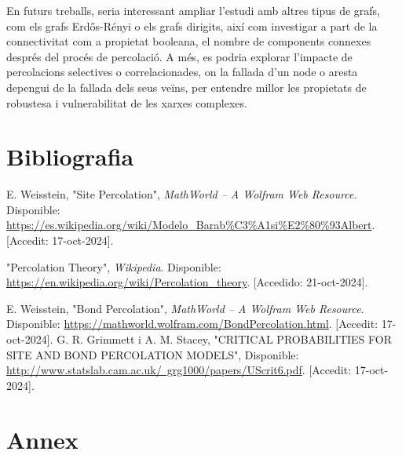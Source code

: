\documentclass[a4paper]{article}
\begin{document}
	En futurs treballs, seria interessant ampliar l'estudi amb altres tipus de grafs, com els grafs Erdős-Rényi o els grafs dirigits, així com investigar a part de la connectivitat com a propietat booleana, el nombre de components connexes després del procés de percolació. A més, es podria explorar l'impacte de percolacions selectives o correlacionades, on la fallada d'un node o aresta depengui de la fallada dels seus veïns, per entendre millor les propietats de robustesa i vulnerabilitat de les xarxes complexes.
	
	\newpage
	\section{Bibliografia}
	
	\renewcommand{\refname}{}	
	\begin{thebibliography}{99}
		\vspace{-2em}
		
		 E. Weisstein, "Site Percolation", \textit{MathWorld -- A Wolfram Web Resource}. Disponible: \href{https://es.wikipedia.org/wiki/Modelo_Barab%C3%A1si%E2%80%93Albert}{https://es.wikipedia.org/wiki/Modelo\_Barab\%C3\%A1si\%E2\%80\%93Albert}. [Accedit: 17-oct-2024].
		
		 "Percolation Theory", \textit{Wikipedia}. Disponible: \href{https://en.wikipedia.org/wiki/Percolation_theory}{https://en.wikipedia.org/wiki/Percolation\_theory}. [Accedido: 21-oct-2024].
		
		
		 E. Weisstein, "Bond Percolation", \textit{MathWorld -- A Wolfram Web Resource}. Disponible: \href{https://mathworld.wolfram.com/BondPercolation.html}{https://mathworld.wolfram.com/BondPercolation.html}. [Accedit: 17-oct-2024].
		 G. R. Grimmett i A. M. Stacey, "CRITICAL PROBABILITIES FOR SITE
		AND BOND PERCOLATION MODELS", Disponible: \href{http://www.statslab.cam.ac.uk/~grg1000/papers/UScrit6.pdf}{http://www.statslab.cam.ac.uk/~grg1000/papers/UScrit6.pdf}. [Accedit: 17-oct-2024].
	
	\end{thebibliography}
	
	\newpage
	\section{Annex}
	
	
\end{document}
